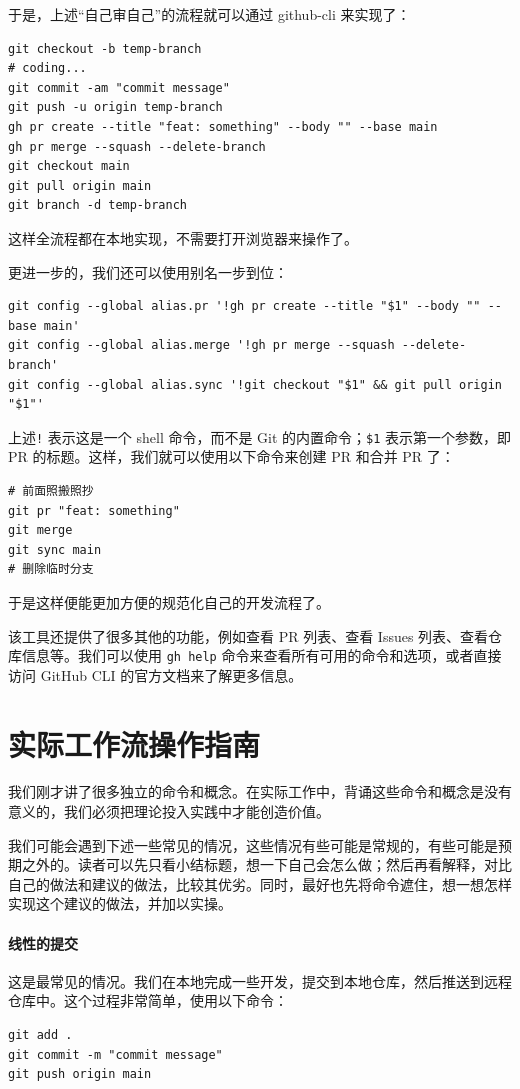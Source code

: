 于是，上述“自己审自己”的流程就可以通过 github-cli 来实现了：
\begin{verbatim}
git checkout -b temp-branch
# coding...
git commit -am "commit message"
git push -u origin temp-branch
gh pr create --title "feat: something" --body "" --base main
gh pr merge --squash --delete-branch
git checkout main
git pull origin main
git branch -d temp-branch
\end{verbatim}
这样全流程都在本地实现，不需要打开浏览器来操作了。

更进一步的，我们还可以使用别名一步到位：
\begin{verbatim}
git config --global alias.pr '!gh pr create --title "$1" --body "" --base main'
git config --global alias.merge '!gh pr merge --squash --delete-branch'
git config --global alias.sync '!git checkout "$1" && git pull origin "$1"'
\end{verbatim}
上述\verb|!| 表示这是一个 shell 命令，而不是 Git 的内置命令；\verb|$1| 表示第一个参数，即 PR 的标题。这样，我们就可以使用以下命令来创建 PR 和合并 PR 了：
\begin{verbatim}
# 前面照搬照抄
git pr "feat: something"
git merge
git sync main
# 删除临时分支
\end{verbatim}

于是这样便能更加方便的规范化自己的开发流程了。

该工具还提供了很多其他的功能，例如查看 PR 列表、查看 Issues 列表、查看仓库信息等。我们可以使用 \verb|gh help| 命令来查看所有可用的命令和选项，或者直接访问 GitHub CLI 的官方文档来了解更多信息。

\section{实际工作流操作指南}

我们刚才讲了很多独立的命令和概念。在实际工作中，背诵这些命令和概念是没有意义的，我们必须把理论投入实践中才能创造价值。

我们可能会遇到下述一些常见的情况，这些情况有些可能是常规的，有些可能是预期之外的。读者可以先只看小结标题，想一下自己会怎么做；然后再看解释，对比自己的做法和建议的做法，比较其优劣。同时，最好也先将命令遮住，想一想怎样实现这个建议的做法，并加以实操。

\paragraph{线性的提交} 这是最常见的情况。我们在本地完成一些开发，提交到本地仓库，然后推送到远程仓库中。这个过程非常简单，使用以下命令：
\begin{verbatim}
git add .
git commit -m "commit message"
git push origin main
\end{verbatim}


